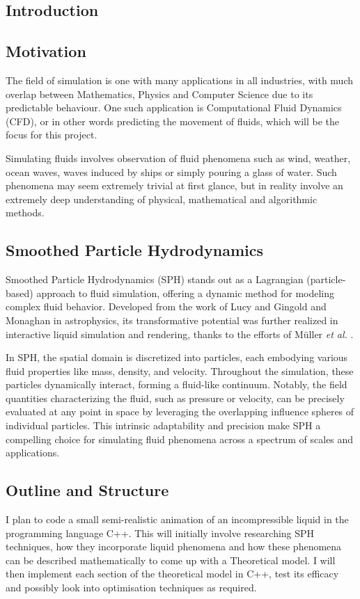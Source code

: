 \documentclass[a4paper,11pt]{article}
\begin{document}
\begin{multicols}{2}
\section{Introduction}
\subsection{Motivation}
The field of simulation is one with many applications in all industries, with much overlap between Mathematics, Physics and Computer Science due to its predictable behaviour. One such application is Computational Fluid Dynamics (CFD), or in other words predicting the movement of fluids, which will be the focus for this project.

Simulating fluids involves observation of fluid phenomena such as wind, weather, ocean waves, waves induced by ships or simply pouring a glass of water. Such phenomena may seem extremely trivial at first glance, but in reality involve an extremely deep understanding of physical, mathematical and algorithmic methods.

\subsection{Smoothed Particle Hydrodynamics}
Smoothed Particle Hydrodynamics (SPH) stands out as a Lagrangian (particle-based) approach to fluid simulation, offering a dynamic method for modeling complex fluid behavior. Developed from the work of Lucy \cite{lucy} and Gingold and Monaghan \cite{gingold} in astrophysics, its transformative potential was further realized in interactive liquid simulation and rendering, thanks to the efforts of Müller \textit{et al.} \cite{muller}.

In SPH, the spatial domain is discretized into particles, each embodying various fluid properties like mass, density, and velocity. Throughout the simulation, these particles dynamically interact, forming a fluid-like continuum. Notably, the field quantities characterizing the fluid, such as pressure or velocity, can be precisely evaluated at any point in space by leveraging the overlapping influence spheres of individual particles. This intrinsic adaptability and precision make SPH a compelling choice for simulating fluid phenomena across a spectrum of scales and applications.

\subsection{Outline and Structure}
I plan to code a small semi-realistic animation of an incompressible liquid in the programming language C++. This will initially involve researching SPH techniques, how they incorporate liquid phenomena and how these phenomena can be described mathematically to come up with a Theoretical model. I will then implement each section of the theoretical model in C++, test its efficacy and possibly look into optimisation techniques as required.


\end{multicols}
\end{document}
